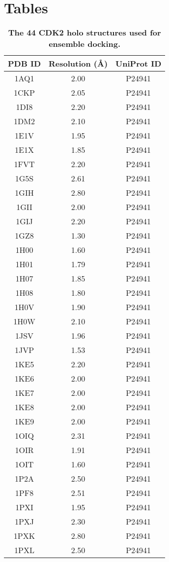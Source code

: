 \documentclass[10pt]{article}
\begin{document}
\section*{Tables}

\begin{table}
\caption{
\bf{The 44 CDK2 holo structures used for ensemble docking.}}
\begin{tabular}{ccc}
\hline
PDB ID & Resolution (\AA) & UniProt ID\\
\hline
1AQ1 & 2.00 & P24941\\
1CKP & 2.05 & P24941\\
1DI8 & 2.20 & P24941\\
1DM2 & 2.10 & P24941\\
1E1V & 1.95 & P24941\\
1E1X & 1.85 & P24941\\
1FVT & 2.20 & P24941\\
1G5S & 2.61 & P24941\\
1GIH & 2.80 & P24941\\
1GII & 2.00 & P24941\\
1GIJ & 2.20 & P24941\\
1GZ8 & 1.30 & P24941\\
1H00 & 1.60 & P24941\\
1H01 & 1.79 & P24941\\
1H07 & 1.85 & P24941\\
1H08 & 1.80 & P24941\\
1H0V & 1.90 & P24941\\
1H0W & 2.10 & P24941\\
1JSV & 1.96 & P24941\\
1JVP & 1.53 & P24941\\
1KE5 & 2.20 & P24941\\
1KE6 & 2.00 & P24941\\
1KE7 & 2.00 & P24941\\
1KE8 & 2.00 & P24941\\
1KE9 & 2.00 & P24941\\
1OIQ & 2.31 & P24941\\
1OIR & 1.91 & P24941\\
1OIT & 1.60 & P24941\\
1P2A & 2.50 & P24941\\
1PF8 & 2.51 & P24941\\
1PXI & 1.95 & P24941\\
1PXJ & 2.30 & P24941\\
1PXK & 2.80 & P24941\\
1PXL & 2.50 & P24941\\

\end{tabular}
\end{table}
\end{document}
